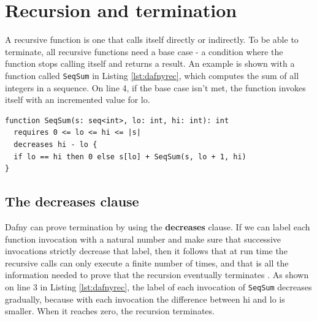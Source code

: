 \documentclass[a4paper]{article}
\begin{document}
\section{Recursion and termination}
A recursive function is one that calls itself directly or indirectly. To be able to terminate, all recursive
functions need a base case - a condition where the function stops calling itself and returns a result. An example
is shown with a function called \texttt{SeqSum} in Listing \ref{lst:dafnyrec}, which computes the sum of all
integers in a sequence. On line 4, if the base case isn't met, the function invokes itself with an incremented value for lo.
\begin{lstlisting}[style=dafnystyle, caption={A function computing the sum of all integers in a sequence recursively.}, label={lst:dafnyrec}]
function SeqSum(s: seq<int>, lo: int, hi: int): int
  requires 0 <= lo <= hi <= |s|
  decreases hi - lo {
  if lo == hi then 0 else s[lo] + SeqSum(s, lo + 1, hi)
}
\end{lstlisting}
\subsection{The decreases clause}
Dafny can prove termination by using the \textbf{decreases} clause. If we can label each function invocation with
a natural number and make sure that successive invocations strictly decrease that label, then it follows
that at run time the recursive calls can only execute a finite number of times, and that is all the information
needed to prove that the recursion eventually terminates \cite{Herbert2012}. As shown on line 3 in Listing
\ref{lst:dafnyrec}, the label of each invocation of \texttt{SeqSum} decreases gradually, because with each invocation
the difference between hi and lo is smaller. When it reaches zero, the recursion terminates.
\end{document}
